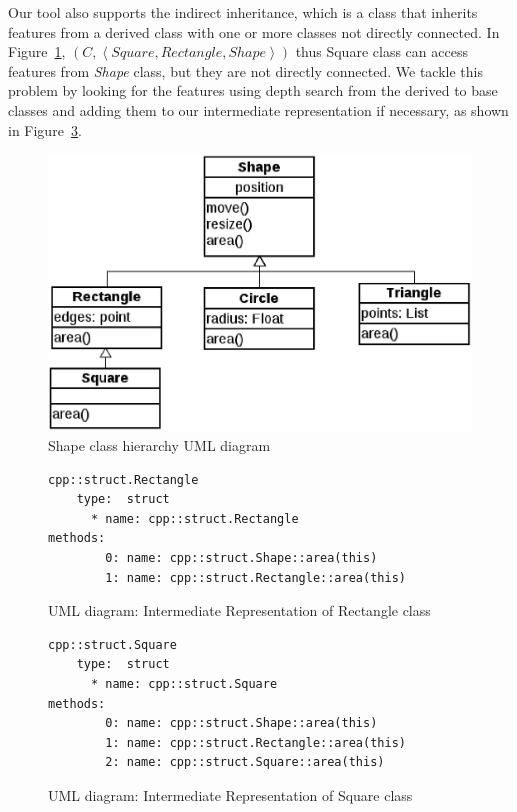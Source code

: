 \documentclass[a4paper]{llncs}
\begin{document}
Our tool also supports the indirect inheritance, which is a class that
inherits features from a derived class with one or more classes
not directly connected. In Figure~\ref{figure:uml_diagram}, \linebreak
$\left(C, \left\langle Square, Rectangle, Shape \right\rangle \right)$
thus Square class can access features from \textit{Shape} class,
but they are not directly connected. We tackle this problem by
looking for the features using depth search from the derived to base classes
and adding them to our intermediate representation if necessary,
as shown in Figure~\ref{figure:IR_uml_square}.


\begin{figure}[ht]
\centering
\includegraphics[scale=0.5]{figures/inheritance_uml}
\caption{Shape class hierarchy UML diagram}
\label{figure:uml_diagram}
\end{figure}



\begin{figure}[h]
\centering
\begin{minipage}{0.9\textwidth}
\begin{lstlisting}[style=nonumbers]
cpp::struct.Rectangle
    type:  struct
      * name: cpp::struct.Rectangle
methods:
        0: name: cpp::struct.Shape::area(this)
        1: name: cpp::struct.Rectangle::area(this)
\end{lstlisting}
\end{minipage}
\caption{UML diagram: Intermediate Representation of Rectangle class}
\label{figure:IR_uml_rec}
\end{figure}


\begin{figure}[h]
\centering
\begin{minipage}{0.9\textwidth}
\begin{lstlisting}[style=nonumbers]
cpp::struct.Square
    type:  struct
      * name: cpp::struct.Square
methods:
        0: name: cpp::struct.Shape::area(this)
        1: name: cpp::struct.Rectangle::area(this)
        2: name: cpp::struct.Square::area(this)
\end{lstlisting}
\end{minipage}
\caption{UML diagram: Intermediate Representation of Square class}
\label{figure:IR_uml_square}
\end{figure}
\end{document}

